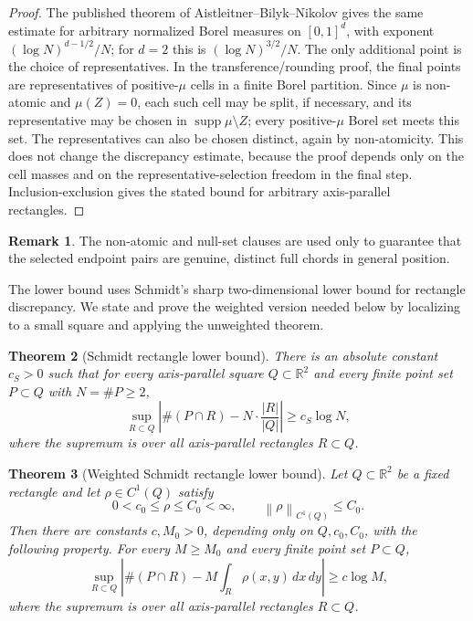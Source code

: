 \documentclass[11pt]{article}
\newtheorem{theorem}{Theorem}[section]
\theoremstyle{definition}
\newtheorem{remark}[theorem]{Remark}
\newcommand{\R}{\mathbb R}
\newcommand{\supp}{\operatorname{supp}}
\newcommand{\norm}[1]{\left\|#1\right\|}
\begin{document}
\begin{proof}
The published theorem of Aistleitner--Bilyk--Nikolov gives the same estimate for arbitrary normalized Borel measures on $[0,1]^d$, with exponent $(\log N)^{d-1/2}/N$; for $d=2$ this is $(\log N)^{3/2}/N$.  The only additional point is the choice of representatives.  In the transference/rounding proof, the final points are representatives of positive-$\mu$ cells in a finite Borel partition.  Since $\mu$ is non-atomic and $\mu(Z)=0$, each such cell may be split, if necessary, and its representative may be chosen in $\supp\mu\setminus Z$; every positive-$\mu$ Borel set meets this set.  The representatives can also be chosen distinct, again by non-atomicity.  This does not change the discrepancy estimate, because the proof depends only on the cell masses and on the representative-selection freedom in the final step.  Inclusion-exclusion gives the stated bound for arbitrary axis-parallel rectangles.
\end{proof}

\begin{remark}
The non-atomic and null-set clauses are used only to guarantee that the selected endpoint pairs are genuine, distinct full chords in general position.
\end{remark}

\smallskip
\noindent
The lower bound uses Schmidt's sharp two-dimensional lower bound for rectangle discrepancy.  We state and prove the weighted version needed below by localizing to a small square and applying the unweighted theorem.

\begin{theorem}[Schmidt rectangle lower bound]\label{thm:schmidt-rect}
There is an absolute constant $c_S>0$ such that for every axis-parallel square $Q\subset\R^2$ and every finite point set $P\subset Q$ with $N=\#P\ge2$,
\[
        \sup_{R\subset Q}
        \left|
        \#(P\cap R)-N\cdot\frac{|R|}{|Q|}
        \right|
        \ge c_S\log N,
\]
where the supremum is over all axis-parallel rectangles $R\subset Q$.
\end{theorem}

\begin{theorem}[Weighted Schmidt rectangle lower bound]\label{thm:weighted-schmidt}
Let $Q\subset\R^2$ be a fixed rectangle and let $\rho\in C^1(Q)$ satisfy
\[
        0<c_0\le \rho\le C_0<\infty,
        \qquad
        \norm{\rho}_{C^1(Q)}\le C_0.
\]
Then there are constants $c,M_0>0$, depending only on $Q,c_0,C_0$, with the following property. For every $M\ge M_0$ and every finite point set $P\subset Q$,
\[
        \sup_{R\subset Q}
        \left|
        \#(P\cap R)-M\int_R\rho(x,y)\,dx\,dy
        \right|
        \ge c\log M,
\]
where the supremum is over all axis-parallel rectangles $R\subset Q$.
\end{theorem}
\end{document}
